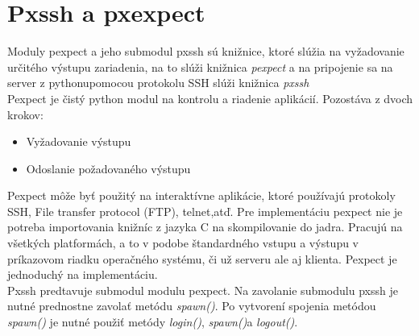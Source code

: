 \section{Pxssh a pxexpect}
Moduly pexpect\cite{pexpect} a jeho submodul pxssh\cite{pxssh} sú knižnice, ktoré slúžia na vyžadovanie určitého výstupu zariadenia, na to slúži knižnica \textit{pexpect} a na pripojenie sa na server z pythonupomocou protokolu SSH slúži knižnica \textit{pxssh}\\
Pexpect je čistý python modul na kontrolu a riadenie aplikácií. Pozostáva z dvoch krokov:\begin{itemize}
\item Vyžadovanie výstupu
\item Odoslanie požadovaného výstupu
\end{itemize} 
Pexpect môže byť použitý na interaktívne aplikácie, ktoré používajú protokoly SSH, File transfer protocol (FTP), telnet,atď. Pre implementáciu pexpect nie je potreba importovania knižníc z jazyka C na skompilovanie do jadra. Pracujú na všetkých platformách, a to v podobe štandardného vstupu a výstupu v príkazovom riadku operačného systému, či už serveru ale aj klienta. Pexpect je jednoduchý na implementáciu.\\
Pxssh predtavuje submodul modulu pexpect. Na zavolanie submodulu pxssh je nutné prednostne zavolať metódu \textit{spawn()}. Po vytvorení spojenia metódou \textit{spawn()} je nutné použiť metódy \textit{login()}, \textit{spawn()}a \textit{logout()}.
